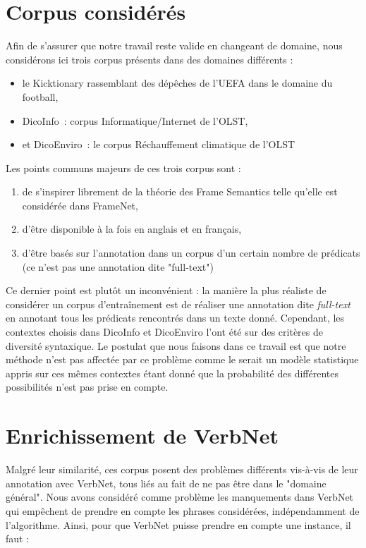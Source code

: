 \section{Corpus considérés}

Afin de s'assurer que notre travail reste valide en changeant de domaine, nous
considérons ici trois corpus présents dans des domaines différents :

\begin{itemize}
    \item le Kicktionary rassemblant des dépêches de l'UEFA dans le domaine du football,
    \item DicoInfo~: corpus Informatique/Internet de l'OLST,
    \item et DicoEnviro~: le corpus Réchauffement climatique de l'OLST
\end{itemize}

Les points communs majeurs de ces trois corpus sont :
\begin{enumerate}
    \item de s'inspirer librement de la théorie des Frame Semantics telle qu'elle est considérée dans FrameNet,
    \item d'être disponible à la fois en anglais et en français,
    \item d'être basés sur l'annotation dans un corpus d'un certain nombre de prédicats (ce n'est pas une annotation dite "full-text")
\end{enumerate}

Ce dernier point est plutôt un inconvénient : la manière la plus réaliste de
considérer un corpus d'entraînement est de réaliser une annotation dite
\textit{full-text} en annotant tous les prédicats rencontrés dans un texte
donné. Cependant, les contextes choisis dans DicoInfo et DicoEnviro l'ont été
sur des critères de diversité syntaxique. \citep{lhomme2012adding} Le postulat
que nous faisons dans ce travail est que notre méthode n'est pas affectée par
ce problème comme le serait un modèle statistique appris sur ces mêmes
contextes étant donné que la probabilité des différentes possibilités n'est pas
prise en compte.

\section{Enrichissement de VerbNet}

Malgré leur similarité, ces corpus posent des problèmes différents vis-à-vis de
leur annotation avec VerbNet, tous liés au fait de ne pas être dans le "domaine
général". Nous avons considéré comme problème les manquements dans VerbNet qui
empêchent de prendre en compte les phrases considérées, indépendamment de
l'algorithme. Ainsi, pour que VerbNet puisse prendre en compte une instance, il
faut :

